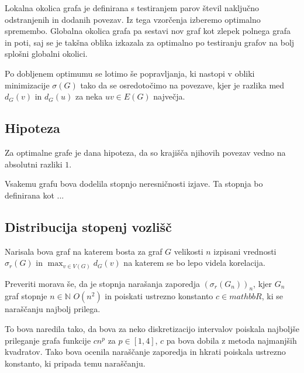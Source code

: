 \documentclass[ letterpaper, titlepage, fleqn]{article}
\begin{document}
Lokalna okolica grafa je definirana s testiranjem parov števil naključno
odstranjenih in dodanih povezav. Iz tega vzorčenja izberemo optimalno 
spremembo.
Globalna okolica grafa pa sestavi nov graf kot zlepek polnega grafa in poti, 
saj se je takšna oblika izkazala za optimalno po testiranju grafov na
bolj splošni globalni okolici.

Po dobljenem optimumu se lotimo še popravljanja, ki nastopi v obliki
minimizacije $\sigma(G)$ tako da se osredotočimo na povezave, kjer
je razlika med $d_G(v)$ in $d_G(u)$ za neka $uv \in E(G)$ največja.

\subsection{Hipoteza}

Za optimalne grafe je dana hipoteza, da so krajišča njihovih povezav
vedno na absolutni razliki $1$.

Vsakemu grafu bova dodelila stopnjo neresničnosti izjave.
Ta stopnja bo definirana kot ...

\subsection{Distribucija stopenj vozlišč}
Narisala bova graf na katerem bosta za graf $G$ velikosti $n$ izpisani
vrednosti $\sigma_r(G)$ in $\max_{v \in V(G)}d_G(v)$ na katerem
se bo lepo videla korelacija.

Preveriti morava še, da je stopnja narašanja zaporedja
$(\sigma_r(G_n))_n$, kjer $G_n$ graf stopnje $n \in \mathbb{N}$
$O(n^2)$ in poiskati ustrezno konstanto $c \in mathbb{R}$, ki 
se naraščanju najbolj prilega.

To bova naredila tako, da bova za neko diskretizacijo intervalov
poiskala najboljše prileganje grafa funkcije $cn^p$ za 
$p \in [1, 4]$, $c$ pa bova dobila z metoda najmanjših kvadratov.
Tako bova ocenila naraščanje zaporedja in hkrati poiskala ustrezno
konstanto, ki pripada temu naraščanju.
\end{document}
